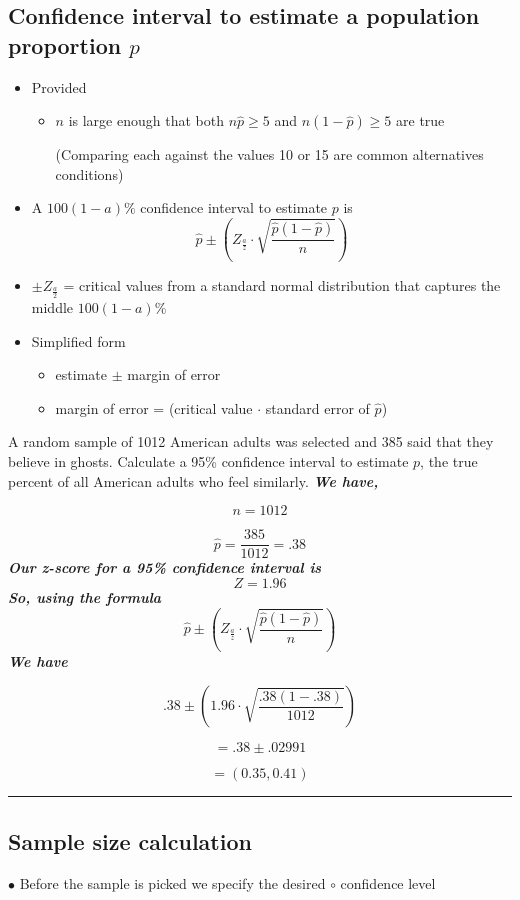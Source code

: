\documentclass{report}
\begin{document}
\subsection*{Confidence interval to estimate a population proportion $p$}
\begin{itemize}
  \item Provided 
    \begin{itemize}
      \item $n$ is large enough that both $n\hat{p} \geq 5$ and $n(1-\hat{p}) \geq 5$ are true
        \vspace{1mm}

        (Comparing each against the values 10 or 15 are common alternatives conditions)
    \end{itemize}
  \item A $100(1-a)\%$ confidence interval to estimate $p$ is
    $$ \hat{p} \pm \left(Z_{\frac{a}{z}} \cdot \sqrt{\frac{\hat{p}(1-\hat{p})}{n}}\right)$$
  \item $\pm{Z_{\frac{a}{2}}}$ = critical values from a standard normal distribution that captures the middle $100(1-a)$\%
  \item Simplified form
    \begin{itemize}
      \item estimate $\pm$ margin of error
      \item margin of error = (critical value $\cdot$ standard error of $\hat{p}$)
    \end{itemize}
\end{itemize}

\pagebreak
\noindent \q 
A random sample of 1012 American adults was selected and 385 said that they believe in ghosts. Calculate a 95\% confidence interval to estimate $p$, the true percent of all American adults who feel similarly.
\bigbreak \noindent
\textit{\textbf{We have,}}

$$ n = 1012$$

$$ \hat{p} = \dfrac{385}{1012} = .38$$
\textit{\textbf{Our z-score for a 95\% confidence interval is}}
$$ Z = 1.96$$
\textit{\textbf{So, using the formula}}
$$ \hat{p} \pm \left(Z_{\frac{a}{z}} \cdot \sqrt{\frac{\hat{p}(1-\hat{p})}{n}}\right)$$
\textit{\textbf{We have}}

$$ .38\pm \left(1.96 \cdot \sqrt{\frac{.38(1-.38)}{1012}}\right)$$

$$ = .38\pm .02991$$

$$ = (0.35,0.41)$$
\bigbreak \noindent
\hrule
\bigbreak \noindent
\subsection*{Sample size calculation}
$\bullet$ Before the sample is picked we specify the desired
\bigbreak 
$\circ$ confidence level
\vspace{1mm}
\end{document}
